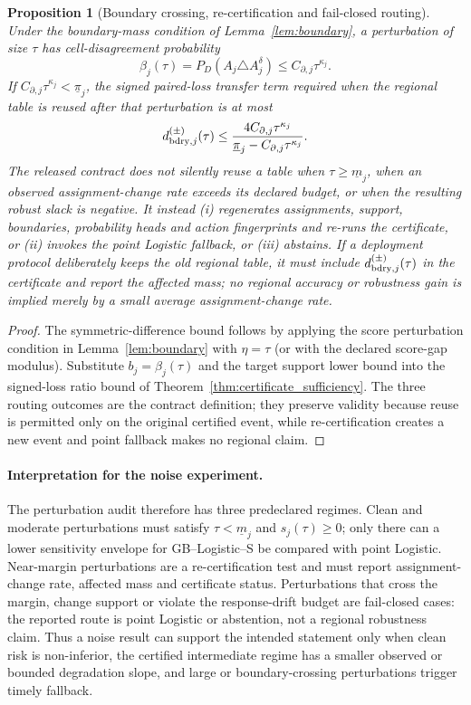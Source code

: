 \documentclass[11pt,a4paper]{article}
\numberwithin{equation}{section}
\newtheorem{proposition}[theorem]{Proposition}
\theoremstyle{definition}\newtheorem{definition}[theorem]{Definition}
\theoremstyle{remark}\newtheorem{remark}[theorem]{Remark}
\begin{document}
\begin{proposition}[Boundary crossing, re-certification and fail-closed routing]\label{prop:boundary_failclosed}
Under the boundary-mass condition of Lemma~\ref{lem:boundary}, a perturbation of
size $\tau$ has cell-disagreement probability
\[
 \beta_j(\tau)=P_D(A_j\triangle A_j^\delta)\le C_{\partial,j}\tau^{\kappa_j}.
\]
If $C_{\partial,j}\tau^{\kappa_j}<\underline\pi_j$, the signed paired-loss transfer
term required when the regional table is reused after that perturbation is at most
\[
 d^{(\pm)}_{{\rm bdry},j}(\tau)
 \le \frac{4C_{\partial,j}\tau^{\kappa_j}}
 {\underline\pi_j-C_{\partial,j}\tau^{\kappa_j}}.
\]
The released contract does not silently reuse a table when $\tau\ge\underline m_j$,
when an observed assignment-change rate exceeds its declared budget, or when the
resulting robust slack is negative.  It instead (i) regenerates assignments,
support, boundaries, probability heads and action fingerprints and re-runs the
certificate, or (ii) invokes the point Logistic fallback, or (iii) abstains.
If a deployment protocol deliberately keeps the old regional table, it must include
$d^{(\pm)}_{{\rm bdry},j}(\tau)$ in the certificate and report the affected mass;
no regional accuracy or robustness gain is implied merely by a small average
assignment-change rate.
\end{proposition}
\begin{proof}
The symmetric-difference bound follows by applying the score perturbation condition
in Lemma~\ref{lem:boundary} with $\eta=\tau$ (or with the declared score-gap
modulus).  Substitute $b_j=\beta_j(\tau)$ and the target support lower bound into
the signed-loss ratio bound of Theorem~\ref{thm:certificate_sufficiency}.  The
three routing outcomes are the contract definition; they preserve validity because
reuse is permitted only on the original certified event, while re-certification
creates a new event and point fallback makes no regional claim.
\end{proof}

\paragraph{Interpretation for the noise experiment.}
The perturbation audit therefore has three predeclared regimes.  Clean and
moderate perturbations must satisfy $\tau<\underline m_j$ and $s_j(\tau)\ge0$;
only there can a lower sensitivity envelope for GB--Logistic--S be compared with
point Logistic.  Near-margin perturbations are a re-certification test and must
report assignment-change rate, affected mass and certificate status.  Perturbations
that cross the margin, change support or violate the response-drift budget are
fail-closed cases: the reported route is point Logistic or abstention, not a
regional robustness claim.  Thus a noise result can support the intended statement
only when clean risk is non-inferior, the certified intermediate regime has a
smaller observed or bounded degradation slope, and large or boundary-crossing
perturbations trigger timely fallback.
\end{document}
